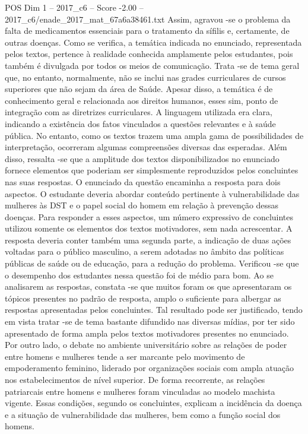\begin{textsample}{POS Dim 1 – 2017\_c6 – Score -2.00 – 2017\_c6/enade\_2017\_mat\_67a6a38461.txt}
Assim, agravou -se o problema da falta de medicamentos essenciais para o tratamento da sífilis e, certamente, de outras doenças.
Como se verifica, a temática indicada no enunciado, representada pelos textos, pertence à realidade conhecida amplamente pelos estudantes, pois também é divulgada por todos os meios de comunicação.
Trata -se de tema geral que, no entanto, normalmente, não se inclui nas grades curriculares de cursos superiores que não sejam da área de Saúde.
Apesar disso, a temática é de conhecimento geral e relacionada aos direitos humanos, esses sim, ponto de integração com as diretrizes curriculares.
A linguagem utilizada era clara, indicando a existência dos fatos vinculados a questões relevantes e à saúde pública.
No entanto, como os textos trazem uma ampla gama de possibilidades de interpretação, ocorreram algumas compreensões diversas das esperadas.
Além disso, ressalta -se que a amplitude dos textos disponibilizados no enunciado fornece elementos que poderiam ser simplesmente reproduzidos pelos concluintes nas suas respostas.
O enunciado da questão encaminha a resposta para dois aspectos.
O estudante deveria abordar conteúdo pertinente à vulnerabilidade das mulheres às DST e o papel social do homem em relação à prevenção dessas doenças.
Para responder a esses aspectos, um número expressivo de concluintes utilizou somente os elementos dos textos motivadores, sem nada acrescentar.
A resposta deveria conter também uma segunda parte, a indicação de duas ações voltadas para o público masculino, a serem adotadas no âmbito das políticas públicas de saúde ou de educação, para a redução do problema.
Verificou -se que o desempenho dos estudantes nessa questão foi de médio para bom.
Ao se analisarem as respostas, constata -se que muitos foram os que apresentaram os tópicos presentes no padrão de resposta, amplo o suficiente para albergar as respostas apresentadas pelos concluintes.
Tal resultado pode ser justificado, tendo em vista tratar -se de tema bastante difundido nas diversas mídias, por ter sido apresentado de forma ampla pelos textos motivadores presentes no enunciado.
Por outro lado, o debate no ambiente universitário sobre as relações de poder entre homens e mulheres tende a ser marcante pelo movimento de empoderamento feminino, liderado por organizações sociais com ampla atuação nos estabelecimentos de nível superior.
De forma recorrente, as relações patriarcais entre homens e mulheres foram vinculadas ao modelo machista vigente.
Essas condições, segundo os concluintes, explicam a incidência da doença e a situação de vulnerabilidade das mulheres, bem como a função social dos homens.

\end{textsample}
